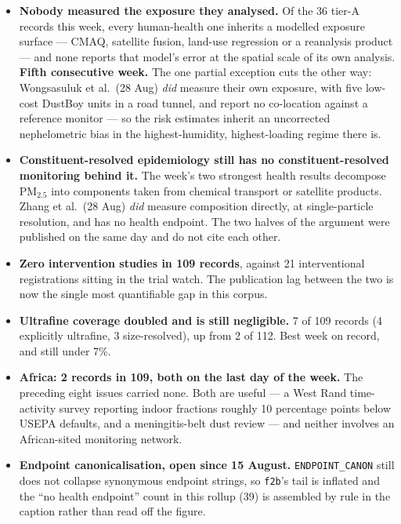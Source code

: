 \documentclass[10pt]{article}
\begin{document}
\footnotesize
\begin{itemize}
\item \textbf{Nobody measured the exposure they analysed.} Of the 36 tier-A records this
week, every human-health one inherits a modelled exposure surface --- CMAQ, satellite
fusion, land-use regression or a reanalysis product --- and none reports that model's
error at the spatial scale of its own analysis. \textbf{Fifth consecutive week.} The one
partial exception cuts the other way: Wongsasuluk et al.\ (28 Aug) \emph{did} measure
their own exposure, with five low-cost DustBoy units in a road tunnel, and report no
co-location against a reference monitor --- so the risk estimates inherit an uncorrected
nephelometric bias in the highest-humidity, highest-loading regime there is.

\item \textbf{Constituent-resolved epidemiology still has no constituent-resolved
monitoring behind it.} The week's two strongest health results decompose PM$_{2.5}$ into
components taken from chemical transport or satellite products. Zhang et al.\ (28 Aug)
\emph{did} measure composition directly, at single-particle resolution, and has no health
endpoint. The two halves of the argument were published on the same day and do not cite
each other.

\item \textbf{Zero intervention studies in 109 records}, against 21 interventional
registrations sitting in the trial watch. The publication lag between the two is now the
single most quantifiable gap in this corpus.

\item \textbf{Ultrafine coverage doubled and is still negligible.} 7 of 109 records
(4 explicitly ultrafine, 3 size-resolved), up from 2 of 112. Best week on record, and
still under 7\%.

\item \textbf{Africa: 2 records in 109, both on the last day of the week.} The preceding
eight issues carried none. Both are useful --- a West Rand time-activity survey reporting
indoor fractions roughly 10 percentage points below USEPA defaults, and a meningitis-belt
dust review --- and neither involves an African-sited monitoring network.

\item \textbf{Endpoint canonicalisation, open since 15 August.} \texttt{ENDPOINT\_CANON}
still does not collapse synonymous endpoint strings, so \texttt{f2b}'s tail is inflated
and the ``no health endpoint'' count in this rollup (39) is assembled by rule in the
caption rather than read off the figure.
\end{itemize}
\end{document}
